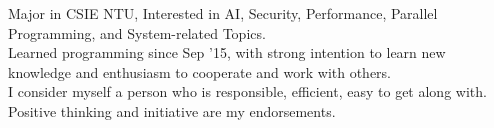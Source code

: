 

\begin{cvparagraph}

Major in CSIE  NTU,  Interested  in  AI,  Security,  Performance,  Parallel  Programming, and  System-related Topics.
\\ Learned programming since Sep '15, with strong intention to learn new knowledge and enthusiasm to cooperate and work with others.
\\ I consider myself a person who is responsible, efficient, easy to get along with. Positive thinking and initiative are my endorsements.
\end{cvparagraph}
